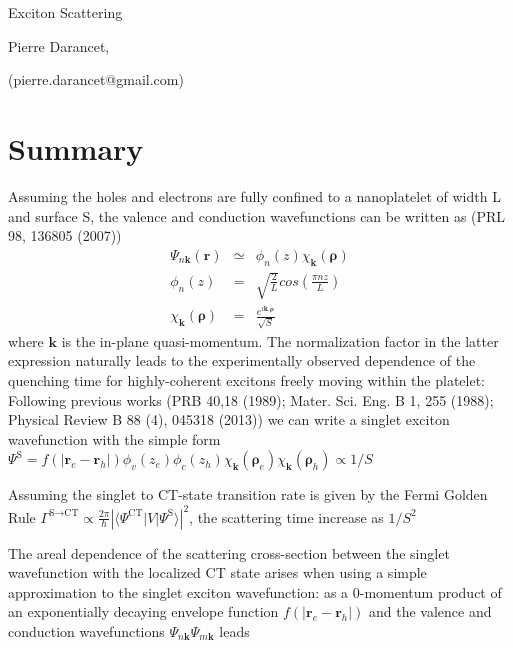 \documentclass[book]{revtex4}
\begin{document}
\date{\today}
\thispagestyle{empty}

\begin{center}
{\LARGE Exciton Scattering}\\
\vspace*{0.2cm}
{\normalsize {\sc Pierre Darancet}, \\ 
\vspace*{0.1cm}

(pierre.darancet@gmail.com)}
\end{center}

\section{Summary}

Assuming the holes and electrons are fully confined to a nanoplatelet of width L and surface S, the valence and conduction wavefunctions can be written as (PRL 98, 136805 (2007))
\begin{eqnarray*}
\Psi_{n\mathbf{k}}\left( \mathbf{r} \right) &\simeq& \phi_{n} \left( z  \right)  \chi_{\mathbf{k}} \left(  \mathbf{\rho}  \right) \\
\phi_{n} \left( z  \right)  &=& \sqrt{\frac{2}{L}} cos\left(\frac{\pi n z}{L} \right) \\
\chi_{\mathbf{k}} \left(  \mathbf{\rho}  \right)  &=& \frac{e^{i\mathbf{k.}\mathbf{\rho}}}{\sqrt{S}}
\end{eqnarray*}
where $\mathbf{k}$ is the in-plane quasi-momentum. The normalization factor in the latter expression naturally leads to the experimentally observed dependence of the quenching time for highly-coherent excitons freely moving within the platelet: Following previous works (PRB 40,18 (1989); Mater. Sci. Eng. B 1, 255 (1988); Physical Review B 88 (4), 045318 (2013)) we can write a singlet exciton wavefunction with the simple form $\Psi^\textrm{S}= f\left(\vert\mathbf{r}_e - \mathbf{r}_h \vert \right) \phi_{v} \left( z_e  \right) \phi_{c} \left( z_h \right) \chi_{\mathbf{k}} \left(  \mathbf{\rho}_e  \right) \chi_{\mathbf{k}} \left(  \mathbf{\rho}_h  \right) \propto 1/S$  

Assuming the singlet to CT-state transition rate is given by the Fermi Golden Rule $\Gamma^{\textrm{S} \rightarrow  \textrm{CT}} \propto \frac{2\pi}{\hbar} \left| \langle \Psi^{\textrm{CT}} \vert V  \vert \Psi^{\textrm{S}} \rangle \right|^2$, the scattering time increase as $ 1/S^{2}$  

The areal dependence of the scattering cross-section between the singlet wavefunction with the localized CT state  arises when using a simple approximation to the singlet exciton wavefunction: 
 as a 0-momentum product of an exponentially decaying envelope function  $f\left(\vert\mathbf{r}_e - \mathbf{r}_h \vert \right)$ and  the valence and conduction wavefunctions  $\Psi_{n\mathbf{k}}  \Psi_{m\mathbf{k} } $ leads 
\end{document}
